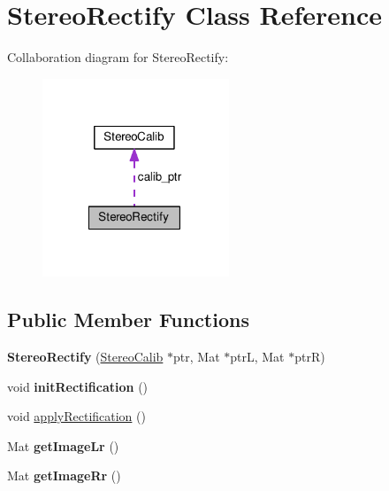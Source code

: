 \hypertarget{class_stereo_rectify}{}\section{Stereo\+Rectify Class Reference}
\label{class_stereo_rectify}


Collaboration diagram for Stereo\+Rectify\+:
\nopagebreak
\begin{figure}[H]
\begin{center}
\leavevmode
\includegraphics[width=158pt]{class_stereo_rectify__coll__graph}
\end{center}
\end{figure}
\subsection*{Public Member Functions}
\begin{DoxyCompactItemize}
\item 
{\bfseries Stereo\+Rectify} (\hyperlink{class_stereo_calib}{Stereo\+Calib} $\ast$ptr, Mat $\ast$ptrL, Mat $\ast$ptrR)\hypertarget{class_stereo_rectify_aed135d14152045de85f94bbac897abbd}{}\label{class_stereo_rectify_aed135d14152045de85f94bbac897abbd}

\item 
void {\bfseries init\+Rectification} ()\hypertarget{class_stereo_rectify_a257b2a3103f32c3fc305e0a49f7a246b}{}\label{class_stereo_rectify_a257b2a3103f32c3fc305e0a49f7a246b}

\item 
void \hyperlink{class_stereo_rectify_ab30b0c556bc470fdcc1c672ade8bcf50}{apply\+Rectification} ()
\item 
Mat {\bfseries get\+Image\+Lr} ()\hypertarget{class_stereo_rectify_ac92b1d24352fb5c4208574c2a1528ec8}{}\label{class_stereo_rectify_ac92b1d24352fb5c4208574c2a1528ec8}

\item 
Mat {\bfseries get\+Image\+Rr} ()\hypertarget{class_stereo_rectify_a1f9abe1a2b245ee51fd5844810e85b83}{}\label{class_stereo_rectify_a1f9abe1a2b245ee51fd5844810e85b83}

\end{DoxyCompactItemize}
